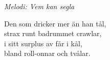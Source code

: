 {\footnotesize\textit{Melodi: Vem kan segla}}\par
\vspace{10pt}
Den som dricker mer än han tål,\\
strax runt badrummet crawlar,\\
i sitt surplus av får i kål,\\
bland roll-onnar och tvålar.
